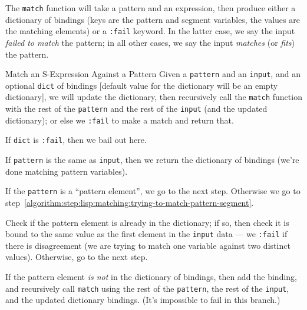 The \lstinline[language=lisp]{match} function will take a pattern and an
expression, then produce either a dictionary of bindings (keys are the
pattern and segment variables, the values are the matching elements) or
a \lstinline[language=lisp]{:fail} keyword. In the latter case, we say
the input \emph{failed to match} the pattern; in all other cases, we say
the input \emph{matches} (or \emph{fits}) the pattern.

\begin{algorithm}{Match an S-Expression Against a Pattern}\label{algorithm:pattern-match-sexpr}
Given a \lstinline[language=lisp]{pattern} and an
\lstinline[language=lisp]{input}, and an optional
\lstinline[language=lisp]{dict} of bindings [default value for the
  dictionary will be an empty dictionary], we will update the
dictionary, then recursively call the
\lstinline[language=lisp]{match} function with
the rest of the \lstinline[language=lisp]{pattern} and the rest of the
\lstinline[language=lisp]{input} (and the updated dictionary); or else
we \lstinline[language=lisp]{:fail} to make a match and return that.\setcounter{algorithmstep}{-1}

 If \lstinline[language=lisp]{dict} is
\lstinline[language=lisp]{:fail}, then we bail out here.

 If
\lstinline[language=lisp]{pattern} is the same as
\lstinline[language=lisp]{input}, then we return the dictionary of
bindings (we're done matching pattern variables).

 If the \lstinline[language=lisp]{pattern} is a ``pattern
element'', we go to the next step. Otherwise we go to step~\ref{algorithm:step:lisp:matching:trying-to-match-pattern-segment}.

Check if the pattern element is already in the dictionary; if so, then
check it is bound to the same value as the first element in the
\lstinline[language=lisp]{input} data --- we
\lstinline[language=lisp]{:fail} if there is disagreement (we are trying
to match one variable against two distinct values). Otherwise, go to the
next step.

If the pattern element \emph{is not} in the dictionary of bindings, then
add the binding, and recursively call \lstinline[language=lisp]{match}
using the rest of the \lstinline[language=lisp]{pattern},
the rest of the \lstinline[language=lisp]{input}, and the updated
dictionary bindings. (It's impossible to fail in this branch.)


\end{algorithm}
